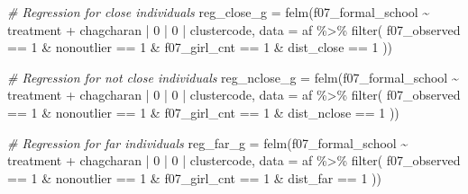 \documentclass[
]{article}
\newenvironment{Shaded}{\begin{snugshade}}{\end{snugshade}}
\newcommand{\AttributeTok}[1]{\textcolor[rgb]{0.77,0.63,0.00}{#1}}
\newcommand{\CommentTok}[1]{\textcolor[rgb]{0.56,0.35,0.01}{\textit{#1}}}
\newcommand{\DecValTok}[1]{\textcolor[rgb]{0.00,0.00,0.81}{#1}}
\newcommand{\FunctionTok}[1]{\textcolor[rgb]{0.00,0.00,0.00}{#1}}
\newcommand{\NormalTok}[1]{#1}
\newcommand{\OtherTok}[1]{\textcolor[rgb]{0.56,0.35,0.01}{#1}}
\newcommand{\SpecialCharTok}[1]{\textcolor[rgb]{0.00,0.00,0.00}{#1}}
\begin{document}
\begin{Shaded}
\begin{Highlighting}[]
\CommentTok{\# Regression for close individuals}
\NormalTok{reg\_close\_g }\OtherTok{=} \FunctionTok{felm}\NormalTok{(f07\_formal\_school }\SpecialCharTok{\textasciitilde{}}\NormalTok{ treatment }\SpecialCharTok{+} 
\NormalTok{                   chagcharan }\SpecialCharTok{|} \DecValTok{0} \SpecialCharTok{|} \DecValTok{0} \SpecialCharTok{|}\NormalTok{ clustercode,}
         \AttributeTok{data =}\NormalTok{ af }\SpecialCharTok{\%\textgreater{}\%} \FunctionTok{filter}\NormalTok{( }
\NormalTok{                              f07\_observed }\SpecialCharTok{==} \DecValTok{1} \SpecialCharTok{\&}
\NormalTok{                              nonoutlier }\SpecialCharTok{==} \DecValTok{1} \SpecialCharTok{\&}
\NormalTok{                              f07\_girl\_cnt }\SpecialCharTok{==} \DecValTok{1} \SpecialCharTok{\&}
\NormalTok{                              dist\_close }\SpecialCharTok{==} \DecValTok{1}
\NormalTok{                              ))}

\CommentTok{\# Regression for not close individuals}
\NormalTok{reg\_nclose\_g }\OtherTok{=} \FunctionTok{felm}\NormalTok{(f07\_formal\_school }\SpecialCharTok{\textasciitilde{}}\NormalTok{ treatment }\SpecialCharTok{+} 
\NormalTok{                   chagcharan }\SpecialCharTok{|} \DecValTok{0} \SpecialCharTok{|} \DecValTok{0} \SpecialCharTok{|}\NormalTok{ clustercode,}
         \AttributeTok{data =}\NormalTok{ af }\SpecialCharTok{\%\textgreater{}\%} \FunctionTok{filter}\NormalTok{( }
\NormalTok{                              f07\_observed }\SpecialCharTok{==} \DecValTok{1} \SpecialCharTok{\&}
\NormalTok{                              nonoutlier }\SpecialCharTok{==} \DecValTok{1} \SpecialCharTok{\&}
\NormalTok{                              f07\_girl\_cnt }\SpecialCharTok{==} \DecValTok{1} \SpecialCharTok{\&}
\NormalTok{                              dist\_nclose }\SpecialCharTok{==} \DecValTok{1}
\NormalTok{                              ))}

\CommentTok{\# Regression for far individuals}
\NormalTok{reg\_far\_g }\OtherTok{=} \FunctionTok{felm}\NormalTok{(f07\_formal\_school }\SpecialCharTok{\textasciitilde{}}\NormalTok{ treatment }\SpecialCharTok{+} 
\NormalTok{                   chagcharan }\SpecialCharTok{|} \DecValTok{0} \SpecialCharTok{|} \DecValTok{0} \SpecialCharTok{|}\NormalTok{ clustercode,}
         \AttributeTok{data =}\NormalTok{ af }\SpecialCharTok{\%\textgreater{}\%} \FunctionTok{filter}\NormalTok{( }
\NormalTok{                              f07\_observed }\SpecialCharTok{==} \DecValTok{1} \SpecialCharTok{\&}
\NormalTok{                              nonoutlier }\SpecialCharTok{==} \DecValTok{1} \SpecialCharTok{\&}
\NormalTok{                              f07\_girl\_cnt }\SpecialCharTok{==} \DecValTok{1} \SpecialCharTok{\&}
\NormalTok{                              dist\_far }\SpecialCharTok{==} \DecValTok{1}
\NormalTok{                              ))}


\end{Highlighting}
\end{Shaded}
\end{document}
